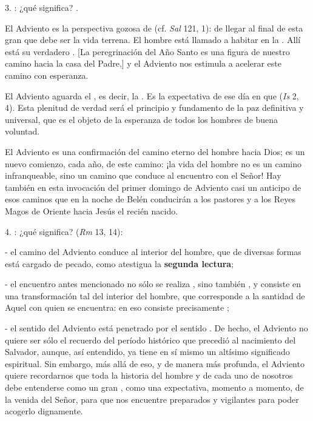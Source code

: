 \begin{body}
	3. : ¿qué significa? .
	
	El Adviento es la perspectiva gozosa de  (cf. \emph{Sal} 121, 1): de llegar al final de esta gran  que debe ser la vida terrena. El hombre está llamado a habitar en la . Allí está su verdadero . {[}La peregrinación del Año Santo es una figura de nuestro camino hacia la casa del Padre,{]} y el Adviento nos estimula a acelerar este camino con esperanza.
	
	El Adviento aguarda el , es decir, la . Es la expectativa de ese día en que  (\emph{Is} 2, 4). Esta plenitud de verdad será el principio y fundamento de la paz definitiva y universal, que es el objeto de la esperanza de todos los hombres de buena voluntad.
	
	El Adviento es una confirmación del camino eterno del hombre hacia Dios; es un nuevo comienzo, cada año, de este camino: ¡la vida del hombre no es un camino infranqueable, sino un camino que conduce al encuentro con el Señor! Hay también en esta invocación del primer domingo de Adviento casi un anticipo de esos caminos que en la noche de Belén conducirán a los pastores y a los Reyes Magos de Oriente hacia Jesús el recién nacido.
	
	4. : ¿qué significa?  (\emph{Rm} 13, 14):
	
	- el camino del Adviento conduce al interior del hombre, que de diversas formas está cargado de pecado, como atestigua la \textbf{segunda lectura};
	
	- el encuentro antes mencionado no sólo se realiza , sino también , y consiste en una transformación tal del interior del hombre, que corresponde a la santidad de Aquel con quien se encuentra: en eso consiste precisamente ;
	
	- el sentido  del Adviento está penetrado por el sentido . De hecho, el Adviento no quiere ser sólo el recuerdo del período histórico que precedió al nacimiento del Salvador, aunque, así entendido, ya tiene en sí mismo un altísimo significado espiritual. Sin embargo, más allá de eso, y de manera más profunda, el Adviento quiere recordarnos que toda la historia del hombre y de cada uno de nosotros debe entenderse como un gran , como una expectativa, momento a momento, de la venida del Señor, para que nos encuentre preparados y vigilantes para poder acogerlo dignamente.
	

\end{body}
